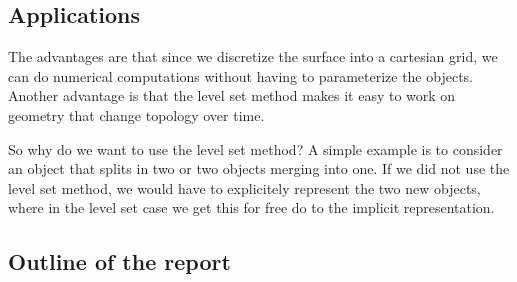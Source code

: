 \subsection{Applications}

The advantages are that since we discretize the surface into a cartesian grid, we can do numerical computations without having to parameterize the objects. Another advantage is that the level set method makes it easy to work on geometry that change topology over time.


So why do we want to use the level set method? A simple example is to consider an object that splits in two or two objects merging into one. If we did not use the level set method, we would have to explicitely represent the two new objects, where in the level set case we get this for free do to the implicit representation.


\newpage

\subsection{Outline of the report}


